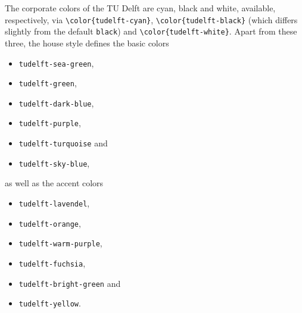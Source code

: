 The corporate colors of the TU Delft are cyan, black and white, available, respectively, via \texttt{\textbackslash color\{{\color{tudelft-cyan}tudelft-cyan}\}}, \texttt{\textbackslash color\{{\color{tudelft-black}tudelft-black}\}} (which differs slightly from the default \texttt{black}) and \texttt{\textbackslash color\{tudelft-white\}}. Apart from these three, the house style defines the basic colors
\begin{itemize}
\itemsep 0pt
\parskip 0pt
\item\texttt{\color{tudelft-sea-green}tudelft-sea-green},
\item\texttt{\color{tudelft-green}tudelft-green},
\item\texttt{\color{tudelft-dark-blue}tudelft-dark-blue},
\item\texttt{\color{tudelft-purple}tudelft-purple},
\item\texttt{\color{tudelft-turquoise}tudelft-turquoise} and
\item\texttt{\color{tudelft-sky-blue}tudelft-sky-blue},
\end{itemize}
as well as the accent colors
\begin{itemize}
\itemsep 0pt
\parskip 0pt
\item\texttt{\color{tudelft-lavendel}tudelft-lavendel},
\item\texttt{\color{tudelft-orange}tudelft-orange},
\item\texttt{\color{tudelft-warm-purple}tudelft-warm-purple},
\item\texttt{\color{tudelft-fuchsia}tudelft-fuchsia},
\item\texttt{\color{tudelft-bright-green}tudelft-bright-green} and
\item\texttt{\color{tudelft-yellow}tudelft-yellow}.
\end{itemize}


